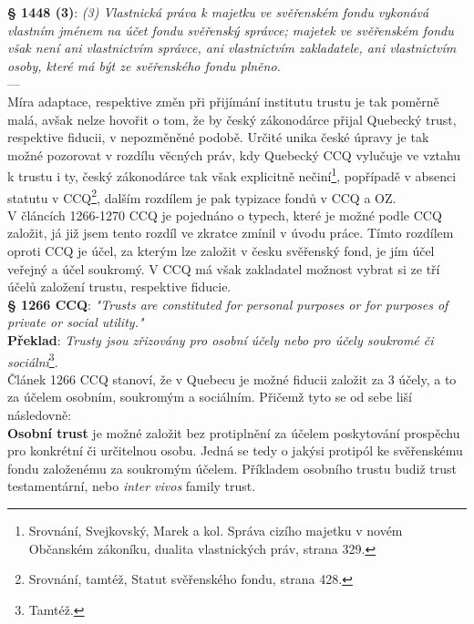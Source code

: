 \documentclass{article}
\begin{document}
\textbf{§ 1448 (3)}:
\textit{(3) Vlastnická práva k majetku ve svěřenském fondu vykonává vlastním jménem na účet fondu svěřenský správce; majetek ve svěřenském fondu však není ani vlastnictvím správce, ani vlastnictvím zakladatele, ani vlastnictvím osoby, které má být ze svěřenského fondu plněno.} \\

---\\

Míra adaptace, respektive změn při přijímání institutu trustu je tak poměrně malá, avšak nelze hovořit o tom, že by český zákonodárce přijal Quebecký trust, respektive fiducii, v nepozměněné podobě. Určité unika české úpravy je tak možné pozorovat v rozdílu věcných práv, kdy Quebecký CCQ vylučuje ve vztahu k trustu i ty, český zákonodárce tak však explicitně nečiní\footnote{Srovnání, Svejkovský, Marek a kol. Správa cizího majetku v novém Občanském zákoníku, dualita vlastnických práv, strana 329.}, popřípadě v absenci statutu v CCQ\footnote{Srovnání, tamtéž, Statut svěřenského fondu, strana 428.}, dalším rozdílem je pak typizace fondů v CCQ a OZ.\\

V článcích 1266-1270 CCQ je pojednáno o typech, které je možné podle CCQ založit, já již jsem tento rozdíl ve zkratce zmínil v úvodu práce. Tímto rozdílem oproti CCQ je účel, za kterým lze založit v česku svěřenský fond, je jím účel veřejný a účel soukromý. V CCQ má však zakladatel možnost vybrat si ze tří účelů založení trustu, respektive fiducie.\\

\textbf{§ 1266 CCQ}: \textit{"Trusts are constituted for personal purposes or for purposes of private or social utility."}\\

\textbf{Překlad}: \textit{Trusty jsou zřizovány pro osobní účely nebo pro účely soukromé či sociální}\footnote{Tamtéž.}.\\

Článek 1266 CCQ stanoví, že v Quebecu je možné fiducii založit za 3 účely, a to za účelem osobním, soukromým a sociálním. Přičemž tyto se od sebe liší následovně:\\

\textbf{Osobní trust} je možné založit bez protiplnění za účelem poskytování prospěchu pro konkrétní či určitelnou osobu. Jedná se tedy o jakýsi protipól ke svěřenskému fondu založenému za soukromým účelem. Příkladem osobního trustu budiž trust testamentární, nebo \textit{inter vivos} family trust.\\
\end{document}
